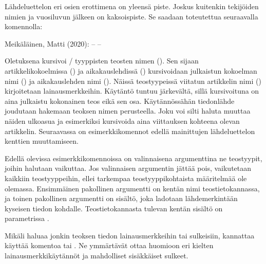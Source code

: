 Lähdeluettelon eri osien erottimena on yleensä piste. Joskus kuitenkin
tekijöiden nimien ja vuosiluvun jälkeen on kaksoispiste. Se saadaan
toteutettua seuraavalla komennolla:

\begin{koodilohkosis}
\end{koodilohkosis}

\begin{tulossis}
  Meikäläinen, Matti (2020): -- --
\end{tulossis}

Oletuksena  kursivoi \-/ tyyppisten
teosten nimen (). Sen sijaan artikkelikokoelmissa
() ja aikakauslehdissä ()
kursivoidaan julkaistun kokoelman nimi () ja
aikakauslehden nimi (). Näissä teostyypeissä
viitatun artikkelin nimi () kirjoitetaan lainausmerkkeihin.
Käytäntö tuntuu järkevältä, sillä kursivoituna on aina julkaistu
kokonainen teos eikä sen osa. Käytännössähän tiedonlähde joudutaan
hakemaan teoksen nimen perusteella. Joku voi silti haluta muuttaa näiden
ulkoasua ja esimerkiksi kursivoida aina viittauksen kohteena olevan
artikkelin. Seuraavassa on esimerkkikomennot edellä mainittujen
lähdeluettelon kenttien muuttamiseen.

\begin{koodilohkosis}
\end{koodilohkosis}

Edellä olevissa esimerkkikomennoissa on valinnaisena argumenttina ne
teostyypit, joihin halutaan vaikuttaa. Jos valinnaisen argumentin jättää
pois, vaikutetaan kaikkiin teostyyppeihin, ellei tarkempaa
teostyyppikohtaista määritelmää ole olemassa. Ensimmäinen pakollinen
argumentti on kentän nimi teostietokannassa, ja toinen pakollinen
argumentti on sisältö, joka ladotaan lähdemerkintään kyseisen tiedon
kohdalle. Teostietokannasta tulevan kentän sisältö on parametrissa
.

Mikäli haluaa jonkin teoksen tiedon lainausmerkkeihin tai sulkeisiin,
kannattaa käyttää komentoa  tai
. Ne ymmärtävät ottaa huomioon eri kielten
lainausmerkkikäytännöt ja mahdolliset sisäkkäiset sulkeet.

